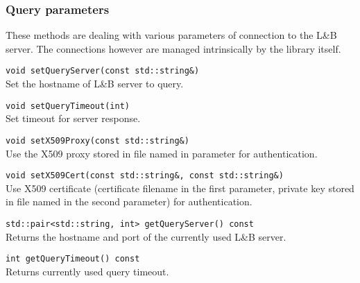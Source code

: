 \documentclass{egee}
\def\LB{L\&B\xspace}
\begin{document}
\subsubsection*{Query parameters}
These methods are dealing with various parameters of connection to the
\LB server. The connections however are managed intrinsically by the
library itself.

\begin{description}
\item{\verb|void setQueryServer(const std::string&)|}\\
Set the hostname of \LB server to query.

\item{\verb|void setQueryTimeout(int)|}\\
Set timeout for server response.

\item{\verb|void setX509Proxy(const std::string&)|}\\
Use the X509 proxy stored in file named in parameter for
authentication. 

\item{\verb|void setX509Cert(const std::string&, const std::string&)|}\\
Use X509 certificate (certificate filename in the first parameter, private
key stored in file named in the second parameter) for authentication.

\item{\verb|std::pair<std::string, int> getQueryServer() const|}\\
Returns the hostname and port of the currently used \LB server.

\item{\verb|int getQueryTimeout() const|}\\
Returns currently used query timeout.

\end{description}
\end{document}
